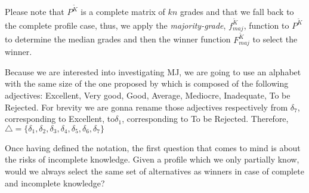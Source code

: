 \documentclass[version=3.21, pagesize, twoside=off, bibliography=totoc, DIV=calc, fontsize=12pt, a4paper]{scrartcl}
\begin{document}
Please note that $P^{\tilde{K}}$ is a complete matrix of $kn$ grades and that we fall back to the complete profile case, thus, we apply the \emph{majority-grade}, $f^{\tilde{K}}_{maj}$, function to $P^{\tilde{K}}$ to determine the median grades and then the winner function $F^{\tilde{K}}_{maj}$ to select the winner. 

\begin{remark}
	Because we are interested into investigating \acs{MJ}, we are going to use an alphabet with the same size of the one proposed by \citet{Balinski2011} which is composed of the following adjectives: Excellent, Very good, Good, Average, Mediocre, Inadequate, To be Rejected. For brevity we are gonna rename those adjectives respectively from $\delta_7$, corresponding to Excellent, to$\delta_1$, corresponding to To be Rejected. Therefore, $\triangle=\{\delta_1,\delta_2, \delta_3,\delta_4,\delta_5,\delta_6,\delta_7\}$ 
\end{remark}

Once having defined the notation, the first question that comes to mind is about the risks of incomplete knowledge. Given a profile which we only partially know, would we always select the same set of alternatives as winners in case of complete and incomplete knowledge?
\end{document}
